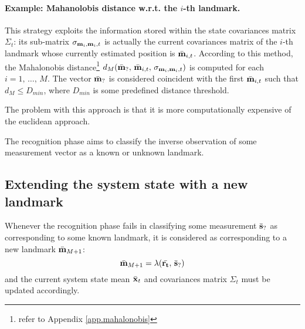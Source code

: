 	\paragraph{Example: Mahanolobis distance w.r.t. the $i$-th landmark.}
		This strategy exploits the information stored within the state covariances matrix $\Sigma_t$: its sub-matrix $\sigma_{\boldsymbol{\mathrm{{m}}}_i,\boldsymbol{\mathrm{{m}}}_i,t}$ is actually the current covariances matrix of the $i$-th landmark whose currently estimated position is $\bar{\boldsymbol{\mathrm{{m}}}}_{i,t}$. 
		According to this method, the Mahalonobis distance\footnote{\label{sec.ekf.mahalobis}refer to Appendix \ref{app.mahalonobis}} $d_M(\bar{\boldsymbol{\mathrm{{m}}}}_?,\, \bar{\boldsymbol{\mathrm{{m}}}}_{i,t},\, \sigma_{\boldsymbol{\mathrm{{m}}}_i,\boldsymbol{\mathrm{{m}}}_i,t})$ is computed for each $i = 1,\, \ldots,\, M$.
		The vector $\bar{\boldsymbol{\mathrm{{m}}}}_?$ is considered coincident with the first $\bar{\boldsymbol{\mathrm{{m}}}}_{i,t}$ such that $d_M\leq D_{min}$, where $D_{min}$ is some predefined distance threshold.
		
		The problem with this approach is that it is more computationally expensive of the euclidean approach.
	
	\vspace{1cm}	
	\begin{recap}
		The recognition phase aims to classify the inverse observation of some measurement vector as a known or unknown landmark.
	\end{recap}
		
\subsection{Extending the system state with a new landmark}
	\label{sec.state_extension}
	
	Whenever the recognition phase fails in classifying some measurement $\bar{\boldsymbol{\mathrm{{s}}}}_?$ as corresponding to some known landmark, it is considered as corresponding to a new landmark $\bar{\boldsymbol{\mathrm{{m}}}}_{M+1}$:
	\[
		\bar{\boldsymbol{\mathrm{{m}}}}_{M+1} = \lambda(\bar{\boldsymbol{\mathrm{{r_t}}}},\, \bar{\boldsymbol{\mathrm{{s}}}}_?)
	\]
	and the current system state mean $\bar{\boldsymbol{\mathrm{{x}}}}_{t}$ and covariances matrix $\Sigma_t$ must be updated accordingly.
	
